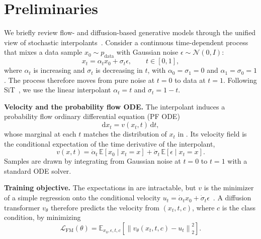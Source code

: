 \section{Preliminaries}
\label{sec:preliminaries}

We briefly review flow- and diffusion-based generative models through the unified view of stochastic interpolants~\citep{albergo2023building,albergo2023stochastic,ma2024sit}. Consider a continuous time-dependent process that mixes a data sample $x_0\sim p_{\mathrm{data}}$ with Gaussian noise $\epsilon\sim\mathcal{N}(0,I)$:
\begin{equation}
x_t=\alpha_t x_0+\sigma_t\epsilon,\qquad t\in[0,1],
\label{eq:stochastic_interpolant}
\end{equation}
where $\alpha_t$ is increasing and $\sigma_t$ is decreasing in $t$, with $\alpha_0=\sigma_1=0$ and $\alpha_1=\sigma_0=1$. The process therefore moves from pure noise at $t=0$ to data at $t=1$. Following SiT~\citep{ma2024sit}, we use the linear interpolant $\alpha_t=t$ and $\sigma_t=1-t$.

\noindent\textbf{Velocity and the probability flow ODE.}
The interpolant induces a probability flow ordinary differential equation (PF ODE)
\begin{equation}
\mathrm{d}x_t=v(x_t,t)\,\mathrm{d}t,
\label{eq:pf_ode}
\end{equation}
whose marginal at each $t$ matches the distribution of $x_t$ in . Its velocity field is the conditional expectation of the time derivative of the interpolant,
\begin{equation}
v(x,t)=\dot\alpha_t\,\mathbb{E}[x_0\mid x_t=x]+\dot\sigma_t\,\mathbb{E}[\epsilon\mid x_t=x].
\label{eq:velocity_field}
\end{equation}
Samples are drawn by integrating  from Gaussian noise at $t=0$ to $t=1$ with a standard ODE solver.

\noindent\textbf{Training objective.}
The expectations in  are intractable, but $v$ is the minimizer of a simple regression onto the conditional velocity $u_t=\dot\alpha_t x_0+\dot\sigma_t\epsilon$~\citep{lipman2022flow,albergo2023stochastic}. A diffusion transformer $v_\theta$ therefore predicts the velocity from $(x_t,t,c)$, where $c$ is the class condition, by minimizing
\begin{equation}
\mathcal{L}_{\mathrm{FM}}(\theta)
=
\mathbb{E}_{x_0,\epsilon,t,c}
\left[
\left\|v_\theta(x_t,t,c)-u_t\right\|_2^2
\right].
\label{eq:flow_matching_loss}
\end{equation}

